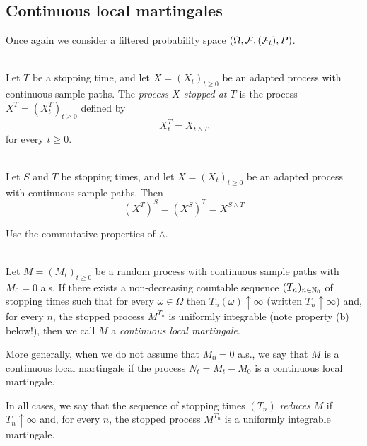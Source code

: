\subsection{Continuous local martingales}
Once again we consider a filtered probability space $(\Omega, \mathcal{F}, (\mathcal{F}_t), P)$.

\begin{definition} \label{chap4.2:definition-stopped_process}
 \\
Let $T$ be a stopping time, and let $X = (X_t)_{t\geq0}$ be an adapted process with continuous sample paths. The \textit{process $X$ stopped at $T$} is the process $X^T=(X_t^T)_{t \geq 0}$ defined by 
$$X_t^T=X_{t \land T}$$
for every $t \geq 0$.
\end{definition}

\begin{proposition}\label{chap4.2:proposition-stable_under_stopping}
 \\
Let $S$ and $T$ be stopping times, and let $X = (X_t)_{t\geq0}$ be an adapted process with continuous sample paths. Then
$$(X^T)^S=(X^S)^T=X^{S \land T}$$
\end{proposition}
\begin{proofidea}
Use the commutative properties of $\land$.
\end{proofidea}


\begin{definition}  \label{chap4.2:definition-continuous-local-martingale}
 \\
Let $M=(M_t)_{t \geq 0}$ be a random process with continuous sample paths with $M_0=0$ a.s. If there exists a non-decreasing countable sequence $(T_n)_{n \in \mathbb{N}_0}$ of stopping times such that for every $\omega \in \Omega$ then $T_n(\omega) \uparrow\infty$ (written $T_n \uparrow\infty$) and, for every $n$, the stopped process $M^{T_n}$ is uniformly integrable (note property (b) below!), then we call $M$ a \textit{continuous local martingale}.

More generally, when we do not assume that $M_0=0$ a.s., we say that $M$ is a continuous local martingale if the process $N_t=M_t-M_0$ is a continuous local martingale. 

In all cases, we say that the sequence of stopping times $(T_n)$ \textit{reduces} $M$ if $T_n \uparrow \infty$ and, for every $n$, the stopped process $M^{T_n}$ is a uniformly integrable martingale.
\end{definition}


